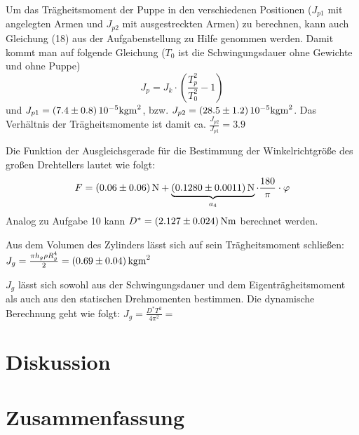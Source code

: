 \documentclass[a4paper,11pt]{article}
\begin{document}
Um das Trägheitsmoment der Puppe in den verschiedenen Positionen ($J_{p1}$ mit angelegten Armen und $J_{p2}$ mit ausgestreckten Armen) zu berechnen, kann auch Gleichung (18) aus der Aufgabenstellung zu Hilfe genommen werden. Damit kommt man auf folgende Gleichung ($T_0$ ist die Schwingungsdauer ohne Gewichte und ohne Puppe)
\begin{equation}
J_p = J_k \cdot \left(\frac{T_p^2}{T_0^2} - 1\right)
\end{equation}
und $J_{p1} = \SI{7.4 \pm 0.8}{10^{-5}kgm^2}$, bzw. $J_{p2} = \SI{28.5 \pm 1.2}{10^{-5}kgm^2}$. Das Verhältnis der Trägheitsmomente ist damit ca. $\frac{J_{p2}}{J_{p1}} = 3.9$


Die Funktion der Ausgleichsgerade für die Bestimmung der Winkelrichtgröße des großen Drehtellers lautet wie folgt:
\begin{equation}
F = \SI{0.06 \pm 0.06}{N} + \underbrace{\SI{0.1280 \pm 0.0011}{N}}_{a_4} \cdot \frac{180}{\pi} \cdot \varphi
\end{equation}
Analog zu Aufgabe 10 kann $D^* = \SI{2.127 \pm 0.024}{Nm}$ berechnet werden.

Aus dem Volumen des Zylinders lässt sich auf sein Trägheitsmoment schließen: $J_g = \frac{\pi h_g \rho R_g^4}{2} = \SI{0.69 \pm 0.04}{kgm^2}$

$J_g$ lässt sich sowohl aus der Schwingungsdauer und dem Eigenträgheitsmoment als auch aus den statischen Drehmomenten bestimmen. Die dynamische Berechnung geht wie folgt: $J_g = \frac{D^*T^2}{4\pi^2} = $

\section{Diskussion}

\section{Zusammenfassung}
\end{document}
